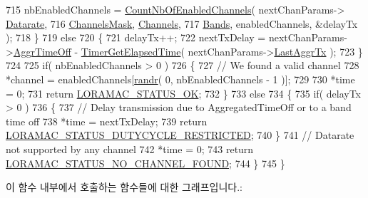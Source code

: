 \begin{DoxyCode}
715         nbEnabledChannels = \mbox{\hyperlink{_region_c_n470_8c_a43fc7f3f4d15301eebe5c4a8b64b3f51}{CountNbOfEnabledChannels}}( nextChanParams->
      \mbox{\hyperlink{structs_next_chan_params_ae2f6080f3aa0e9485c55513ca56bb24d}{Datarate}},
716                                                       \mbox{\hyperlink{_region_c_n470_8c_a2188957b5ca6af8092154d7ccbfa5757}{ChannelsMask}}, 
      \mbox{\hyperlink{_region_c_n470_8c_a23b07a348a0f1b8a5bc01990710126c1}{Channels}},
717                                                       \mbox{\hyperlink{_region_c_n470_8c_a5fa033a12327dde1b783f47403b7d859}{Bands}}, enabledChannels, &delayTx );
718     \}
719     \textcolor{keywordflow}{else}
720     \{
721         delayTx++;
722         nextTxDelay = nextChanParams->\mbox{\hyperlink{structs_next_chan_params_a3609676d2d3b7c00e25615324b35cb26}{AggrTimeOff}} - 
      \mbox{\hyperlink{time_server_8c_a9ca7e27f3d6474daff63f2e093a2e91e}{TimerGetElapsedTime}}( nextChanParams->\mbox{\hyperlink{structs_next_chan_params_a381b728f60b185ecf3313e974c18768b}{LastAggrTx}} );
723     \}
724 
725     \textcolor{keywordflow}{if}( nbEnabledChannels > 0 )
726     \{
727         \textcolor{comment}{// We found a valid channel}
728         *channel = enabledChannels[\mbox{\hyperlink{utilities_8c_af5d8ad6dae489ac64821e7d4f004595d}{randr}}( 0, nbEnabledChannels - 1 )];
729 
730         *time = 0;
731         \textcolor{keywordflow}{return} \mbox{\hyperlink{group___l_o_r_a_m_a_c_gga1d18f26b344040b3ec5c3db662919661a03db5fca052313edb3823c014b653a74}{LORAMAC\_STATUS\_OK}};
732     \}
733     \textcolor{keywordflow}{else}
734     \{
735         \textcolor{keywordflow}{if}( delayTx > 0 )
736         \{
737             \textcolor{comment}{// Delay transmission due to AggregatedTimeOff or to a band time off}
738             *time = nextTxDelay;
739             \textcolor{keywordflow}{return} \mbox{\hyperlink{group___l_o_r_a_m_a_c_gga1d18f26b344040b3ec5c3db662919661a0c982ada0769ecee2e1041fb6945ddd4}{LORAMAC\_STATUS\_DUTYCYCLE\_RESTRICTED}};
740         \}
741         \textcolor{comment}{// Datarate not supported by any channel}
742         *time = 0;
743         \textcolor{keywordflow}{return} \mbox{\hyperlink{group___l_o_r_a_m_a_c_gga1d18f26b344040b3ec5c3db662919661a393266a9952cf6617917f1fce181efcd}{LORAMAC\_STATUS\_NO\_CHANNEL\_FOUND}};
744     \}
745 \}
\end{DoxyCode}
이 함수 내부에서 호출하는 함수들에 대한 그래프입니다.\+:
\mbox{\label{group___r_e_g_i_o_n_c_n470_gadb4b05f4e7b55705e37156add3ed585b}} 

